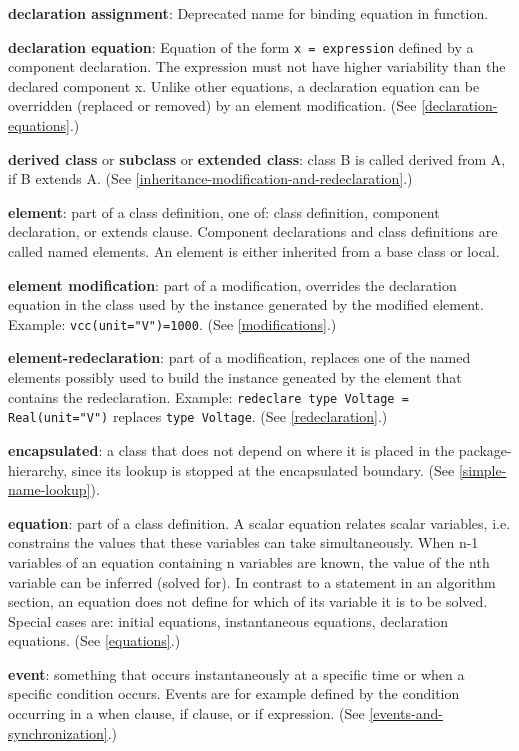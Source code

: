 \textbf{declaration assignment}: Deprecated name for binding equation in function.

\textbf{declaration equation}: Equation of the form \lstinline!x = expression!
defined by a component declaration. The expression must not have higher
variability than the declared component x. Unlike other equations, a
declaration equation can be overridden (replaced or removed) by an
element modification. (See \autoref{declaration-equations}.)

\textbf{derived class} or \textbf{subclass} or \textbf{extended class}:
class B is called derived from A, if B extends A. (See \autoref{inheritance-modification-and-redeclaration}.)

\textbf{element}: part of a class definition, one of: class definition,
component declaration, or extends clause. Component declarations and
class definitions are called named elements. An element is either
inherited from a base class or local.

\textbf{element modification}: part of a modification, overrides the
declaration equation in the class used by the instance generated by the
modified element. Example: \lstinline!vcc(unit="V")=1000!. (See \autoref{modifications}.)

\textbf{element-redeclaration}: part of a modification, replaces one of
the named elements possibly used to build the instance geneated by the
element that contains the redeclaration. Example: \lstinline!redeclare type Voltage = Real(unit="V")! replaces \lstinline!type Voltage!. (See \autoref{redeclaration}.)

\textbf{encapsulated}: a class that does not depend on where it is
placed in the package-hierarchy, since its lookup is stopped at the
encapsulated boundary. (See \autoref{simple-name-lookup}).

\textbf{equation}: part of a class definition. A scalar equation relates
scalar variables, i.e. constrains the values that these variables can
take simultaneously. When n-1 variables of an equation containing n
variables are known, the value of the nth variable can be inferred
(solved for). In contrast to a statement in an algorithm section, an
equation does not define for which of its variable it is to be solved.
Special cases are: initial equations, instantaneous equations,
declaration equations. (See \autoref{equations}.)

\textbf{event}: something that occurs instantaneously at a specific time
or when a specific condition occurs. Events are for example defined by
the condition occurring in a when clause, if clause, or if expression.
(See \autoref{events-and-synchronization}.)

